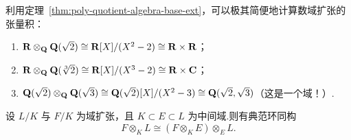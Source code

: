 \begin{example}\label{ex:field-extension-tensors}
利用定理~\ref{thm:poly-quotient-algebra-base-ext}，可以极其简便地计算数域扩张的张量积：
\begin{enumerate}
  \item $\mathbf{R} \otimes_{\mathbf{Q}} \mathbf{Q}(\sqrt{2}) \cong \mathbf{R}[X]/(X^2 - 2) \cong \mathbf{R} \times \mathbf{R}$；
  \item $\mathbf{R} \otimes_{\mathbf{Q}} \mathbf{Q}(\sqrt[3]{2}) \cong \mathbf{R}[X]/(X^3 - 2) \cong \mathbf{R} \times \mathbf{C}$；
  \item $\mathbf{Q}(\sqrt{2}) \otimes_{\mathbf{Q}} \mathbf{Q}(\sqrt{3}) \cong \mathbf{Q}(\sqrt{2})[X]/(X^2 - 3) \cong \mathbf{Q}(\sqrt{2}, \sqrt{3})$（这是一个域！）.
\end{enumerate}
\end{example}

\begin{theorem}\label{thm:intermediate-field-tensor}
设 $L/K$ 与 $F/K$ 为域扩张，且 $K \subset E \subset L$ 为中间域.则有典范环同构
\[
  F \otimes_K L \cong (F \otimes_K E) \otimes_E L.
\]
\end{theorem}
